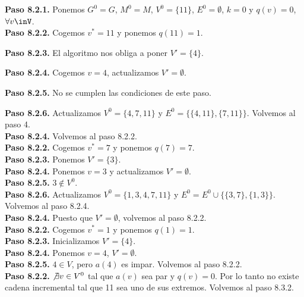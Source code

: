 \documentclass[12pt, oneside, a4paper]{article}
\begin{document}
{{\bf Paso 8.2.1.} Ponemos $G^{0}=G$, $M^{0}=M$, $V^{0}=\{11\}$,
$E^{0}=\emptyset$, $k=0$ y $q(v)=0$, $\forall v\inV$.\\

{\bf Paso 8.2.2.} Cogemos $v^{*}=11$ y ponemos $q(11)=1$.

{\bf Paso 8.2.3.} El algoritmo nos obliga a poner $V'=\{4\}$.

{\bf Paso 8.2.4.} Cogemos $v=4$, actualizamos $V'=\emptyset$.

{\bf Paso 8.2.5.} No se cumplen las condiciones de este paso.

{\bf Paso 8.2.6.} Actualizamos $V^{0}=\{4,7,11\}$ y
$E^{0}=\{\{4,11\},\{7,11\}\}$. Volvemos al paso 4.\\

{\bf Paso 8.2.4.} Volvemos al paso 8.2.2.\\

{\bf Paso 8.2.2.} Cogemos $v^{*}=7$ y ponemos $q(7)=7$.\\

{\bf Paso 8.2.3.} Ponemos $V'=\{3\}$.\\

{\bf Paso 8.2.4.} Ponemos $v=3$ y actualizamos $V'=\emptyset$.\\

{\bf Paso 8.2.5.} $3\not\in V^{0}$.\\

{\bf Paso 8.2.6.} Actualizamos $V^{0}=\{1,3,4,7,11\}$ y
$E^{0}=E^{0}\cup\{\{3,7\},\{1,3\}\}$. Volvemos al paso 8.2.4.\\

{\bf Paso 8.2.4.} Puesto que $V'=\emptyset$, volvemos al paso 8.2.2.\\

{\bf Paso 8.2.2.} Cogemos $v^{*}=1$ y ponemos $q(1)=1$.\\

{\bf Paso 8.2.3.} Inicializamos $V'=\{4\}$.\\

{\bf Paso 8.2.4.} Ponemos $v=4$, $V'=\emptyset$.\\

{\bf Paso 8.2.5.} $4\in V$, pero $a(4)$ es impar. Volvemos al paso
8.2.2.\\

{\bf Paso 8.2.2.} $\not\exists v\in V^{0}$ tal que $a(v)$ sea par y
$q(v)=0$. Por lo tanto no existe cadena incremental tal que 11 sea uno
de sus extremos. Volvemos al paso 8.3.2.\\

}
\end{document}

